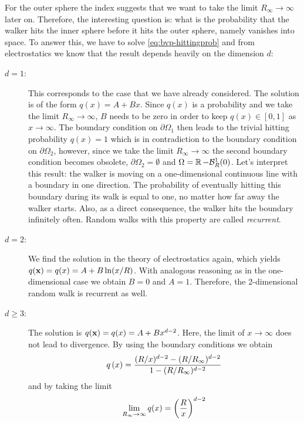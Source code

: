 For the outer sphere the index suggests that we want to take the limit $R_\infty \rightarrow \infty$ later on. Therefore, the interesting question is: what is the probability that the walker hits the inner sphere before it hits the outer sphere, namely vanishes into space. To answer this, we have to solve \autoref{eq:bvp-hittingprob} and from electrostatics we know that the result depends heavily on the dimension $d$:
\begin{description}
 \item[$d=1$:] This corresponds to the case that we have already considered. The solution is of the form $q(x) = A+Bx$. Since $q(x)$ is a probability and we take the limit $R_\infty \rightarrow \infty$, $B$ needs to be zero in order to keep $q(x) \in [0,1]$ as $x\rightarrow\infty$. The boundary condition on $\partial\Omega_1$ then leads to the trivial hitting probability $q(x)=1$ which is in contradiction to the boundary condition on $\partial\Omega_2$, however, since we take the limit $R_\infty \rightarrow \infty$ the second boundary condition becomes obsolete, \ie $\partial\Omega_2 = \emptyset$ and $\Omega = \operatorname{\mathbb{R}} - \mathcal{B}_R^1(0)$. Let's interpret this result: the walker is moving on a one-dimensional continuous line with a boundary in one direction. The probability of eventually hitting this boundary during its walk is equal to one, no matter how far away the walker starts. Also, as a direct consequence, the walker hits the boundary infinitely often. Random walks with this property are called \textit{recurrent}.
 \item[$d=2$:] We find the solution in the theory of electrostatics again, which yields $q(\mathbf{x}) = q(x) = A + B \ln(x/R)$. With analogous reasoning as in the one-dimensional case we obtain $B=0$ and $A=1$. Therefore, the 2-dimensional random walk is recurrent as well.
 \item[$d\geq3$:] The solution is $q(\mathbf{x}) = q(x) = A + B x^{d-2}$. Here, the limit of $x \rightarrow \infty$ does not lead to divergence. By using the boundary conditions we obtain
 \begin{equation}\label{eq:hittingprobd=3}
  q\left(x\right)=\frac{(R/x)^{d-2} - (R/R_\infty)^{d-2}}{1 - (R/R_\infty)^{d-2}}
 \end{equation}
 and by taking the limit
 \begin{equation}\label{eq:coulomb-formula}
  \lim\limits_{R_\infty\rightarrow\infty}{q(x)} = \left(\frac{R}{x}\right)^{d-2}
 \end{equation}

\end{description}
